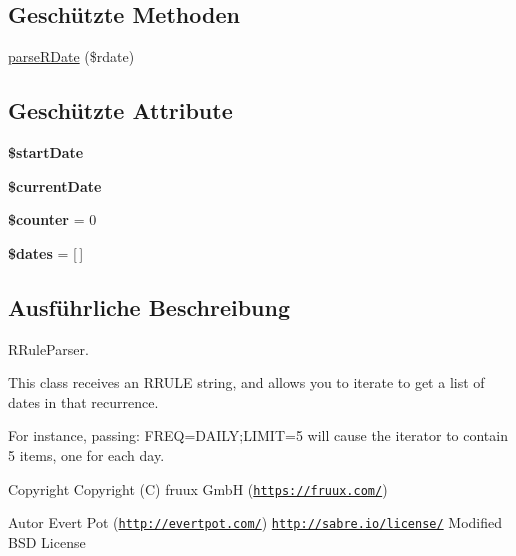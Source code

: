 \subsection*{Geschützte Methoden}
\begin{DoxyCompactItemize}
\item 
\mbox{\hyperlink{class_sabre_1_1_v_object_1_1_recur_1_1_r_date_iterator_ac73801496df3c83e6abfc5118460c77b}{parse\+R\+Date}} (\$rdate)
\end{DoxyCompactItemize}
\subsection*{Geschützte Attribute}
\begin{DoxyCompactItemize}
\item 
\mbox{\label{class_sabre_1_1_v_object_1_1_recur_1_1_r_date_iterator_ad7a4abe53cde774b5236972d89ce9a1e}} 
{\bfseries \$start\+Date}
\item 
\mbox{\label{class_sabre_1_1_v_object_1_1_recur_1_1_r_date_iterator_a318816a3c4235d001e9ccb8b2bfd5865}} 
{\bfseries \$current\+Date}
\item 
\mbox{\label{class_sabre_1_1_v_object_1_1_recur_1_1_r_date_iterator_a169ecc33f7502fd54cd3a30a57d9af31}} 
{\bfseries \$counter} = 0
\item 
\mbox{\label{class_sabre_1_1_v_object_1_1_recur_1_1_r_date_iterator_a8611a495bd603c6ab4e8be375ec6d68e}} 
{\bfseries \$dates} = \mbox{[}$\,$\mbox{]}
\end{DoxyCompactItemize}


\subsection{Ausführliche Beschreibung}
R\+Rule\+Parser.

This class receives an R\+R\+U\+LE string, and allows you to iterate to get a list of dates in that recurrence.

For instance, passing\+: F\+R\+EQ=D\+A\+I\+LY;L\+I\+M\+IT=5 will cause the iterator to contain 5 items, one for each day.

\begin{DoxyCopyright}{Copyright}
Copyright (C) fruux GmbH (\href{https://fruux.com/}{\tt https\+://fruux.\+com/}) 
\end{DoxyCopyright}
\begin{DoxyAuthor}{Autor}
Evert Pot (\href{http://evertpot.com/}{\tt http\+://evertpot.\+com/})  \href{http://sabre.io/license/}{\tt http\+://sabre.\+io/license/} Modified B\+SD License 
\end{DoxyAuthor}


